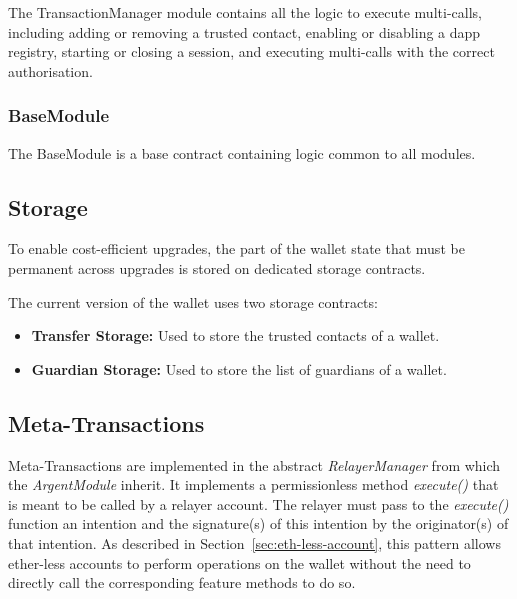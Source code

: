 \documentclass[12pt]{article}
\begin{document}
The TransactionManager module contains all the logic to execute multi-calls, including adding or removing a trusted contact, enabling or disabling a dapp registry, starting or closing a session, and executing multi-calls with the correct authorisation. 

\subsubsection{BaseModule}

The BaseModule is a base contract containing logic common to all modules.

\subsection{Storage}
\label{sec:storage}
To enable cost-efficient upgrades, the part of the wallet state that must be permanent across upgrades is stored on dedicated storage contracts. 

The current version of the wallet uses two storage contracts:
\begin{itemize}
    \item \textbf{Transfer Storage:} Used to store the trusted contacts of a wallet.
    \item \textbf{Guardian Storage:} Used to store the list of guardians of a wallet.
\end{itemize}

\subsection{Meta-Transactions}
\label{sec:meta-transactions}
Meta-Transactions are implemented in the abstract \emph{RelayerManager} from which the \emph{ArgentModule} inherit. It implements a permissionless method \emph{execute()} that is meant to be called by a relayer account. The relayer must pass to the \emph{execute()} function an intention and the signature(s) of this intention by the originator(s) of that intention. As described in Section~\ref{sec:eth-less-account}, this pattern allows ether-less accounts to perform operations on the wallet without the need to directly call the corresponding feature methods to do so.

\end{document}
